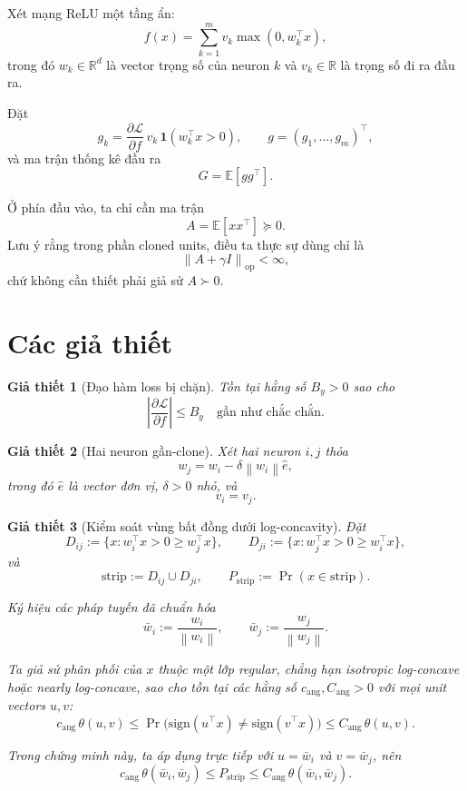 \documentclass[11pt,a4paper]{article}
\newtheorem{assumption}{Giả thiết}
\newcommand{\R}{\mathbb{R}}
\newcommand{\E}{\mathbb{E}}
\newcommand{\norm}[1]{\left\lVert #1 \right\rVert}
\newcommand{\abs}[1]{\left\lvert #1 \right\rvert}
\newcommand{\Ind}{\mathbf 1}
\DeclareMathOperator{\op}{op}
\begin{document}
Xét mạng ReLU một tầng ẩn:
\[
f(x)=\sum_{k=1}^m v_k \max(0,w_k^\top x),
\]
trong đó $w_k \in \R^d$ là vector trọng số của neuron $k$ và $v_k \in \R$ là
trọng số đi ra đầu ra.

Đặt
\[
g_k = \frac{\partial \mathcal L}{\partial f}\, v_k \,\Ind(w_k^\top x > 0),
\qquad
g=(g_1,\ldots,g_m)^\top,
\]
và ma trận thống kê đầu ra
\[
G = \E[gg^\top].
\]

Ở phía đầu vào, ta chỉ cần ma trận
\[
A = \E[xx^\top] \succeq 0.
\]
Lưu ý rằng trong phần cloned units, điều ta thực sự dùng chỉ là
\[
\norm{A+\gamma I}_{\op} < \infty,
\]
chứ không cần thiết phải giả sử $A \succ 0$.

\section{Các giả thiết}

\begin{assumption}[Đạo hàm loss bị chặn]
\label{ass:loss_bounded}
Tồn tại hằng số $B_y > 0$ sao cho
\[
\abs{\frac{\partial \mathcal L}{\partial f}} \le B_y
\quad \text{gần như chắc chắn.}
\]
\end{assumption}

\begin{assumption}[Hai neuron gần-clone]
\label{ass:near_clone}
Xét hai neuron $i,j$ thỏa
\[
w_j = w_i - \delta \norm{w_i}\hat e,
\]
trong đó $\hat e$ là vector đơn vị, $\delta > 0$ nhỏ, và
\[
v_i = v_j.
\]
\end{assumption}

\begin{assumption}[Kiểm soát vùng bất đồng dưới log-concavity]
\label{ass:strip}
Đặt
\[
D_{ij} := \{x : w_i^\top x > 0 \ge w_j^\top x\},
\qquad
D_{ji} := \{x : w_j^\top x > 0 \ge w_i^\top x\},
\]
và
\[
\mathrm{strip} := D_{ij}\cup D_{ji},
\qquad
P_{\mathrm{strip}} := \Pr(x \in \mathrm{strip}).
\]

Ký hiệu các pháp tuyến đã chuẩn hóa
\[
\bar w_i := \frac{w_i}{\norm{w_i}},
\qquad
\bar w_j := \frac{w_j}{\norm{w_j}}.
\]

Ta giả sử phân phối của $x$ thuộc một lớp regular, chẳng hạn isotropic
log-concave hoặc nearly log-concave, sao cho tồn tại các hằng số
$c_{\mathrm{ang}}, C_{\mathrm{ang}} > 0$ với mọi unit vectors $u,v$:
\[
c_{\mathrm{ang}}\,\theta(u,v)
\le
\Pr\!\bigl(\mathrm{sign}(u^\top x)\neq \mathrm{sign}(v^\top x)\bigr)
\le
C_{\mathrm{ang}}\,\theta(u,v).
\]

Trong chứng minh này, ta áp dụng trực tiếp với $u=\bar w_i$ và $v=\bar w_j$,
nên
\[
c_{\mathrm{ang}}\,\theta(\bar w_i,\bar w_j)
\le
P_{\mathrm{strip}}
\le
C_{\mathrm{ang}}\,\theta(\bar w_i,\bar w_j).
\]
\end{assumption}
\end{document}
